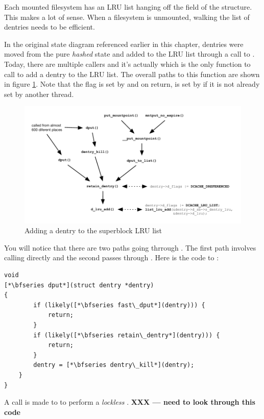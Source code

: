 Each mounted filesystem has an LRU list hanging off the \cf{} field of the  structure. This makes a lot of sense. When a filesystem is unmounted, walking the list of dentries needs to be efficient. 

In the original state diagram referenced earlier in this chapter, dentries were moved from the pure \textit{hashed} state and added to the LRU list through a call to . Today, there are multiple callers and it's actually  which is the only function to call  to add a dentry to the LRU list. The overall paths to this function are shown in figure \ref{fig:dentry-lru-add}. Note that the  flag is set by  and on return,  is set by  if it is not already set by another thread.

\begin{figure}[h]
	\includegraphics[scale=0.8]{figures/dentry-lru-add.pdf}
	\centering
	\caption{Adding a dentry to the superblock LRU list}
	\label{fig:dentry-lru-add}
\end{figure}

You will notice that there are two paths going thrrough . The first path involves calling  directly and the second passes through . Here is the code to :

\begin{lstlisting}
void 
[*\bfseries dput*](struct dentry *dentry)
{
        if (likely([*\bfseries fast\_dput*](dentry))) {
            return;
        }
        if (likely([*\bfseries retain\_dentry*](dentry))) {
            return;
        }
        dentry = [*\bfseries dentry\_kill*](dentry);
    }
}
\end{lstlisting}

\noindent
A call is made to  to perform a \textit{lockless} . \textbf{XXX --- need to look through this code}

